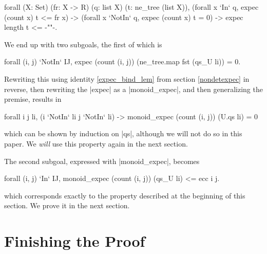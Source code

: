 \documentclass[runningheads]{llncs}
\begin{document}
\begin{code}
  forall (X: Set) (fr: X -> R) (q: list X) (t: ne_tree (list X)),
    (forall x `In` q, expec (count x) t <= fr x) ->
    (forall x `NotIn` q, expec (count x) t = 0) -> expec length t <= {-""-}.
\end{code}
We end up with two subgoals, the first of which is \begin{code}forall (i, j) `NotIn` IJ, expec (count (i, j)) (ne_tree.map fst (qs_U li)) = 0.\end{code} Rewriting this using identity \ref{expec_bind_lem} from section \ref{nondetexpec} in reverse, then rewriting the |expec| as a |monoid_expec|, and then generalizing the premise, results in
\begin{code}
  forall i j li, (i `NotIn` li \/ j `NotIn` li) -> monoid_expec (count (i, j)) (U.qs li) = 0 
\end{code}
which can be shown by induction on |qs|, although we will not do so in this paper. We \emph{will} use this property again in the next section.

The second subgoal, expressed with |monoid_expec|, becomes
\begin{code}
  forall (i, j) `In` IJ, monoid_expec (count (i, j)) (qs_U li) <= ecc i j. 
\end{code}
which corresponds exactly to the property described at the beginning of this section. We prove it in the next section.

\section{Finishing the Proof}
\label{finishing}
\end{document}
